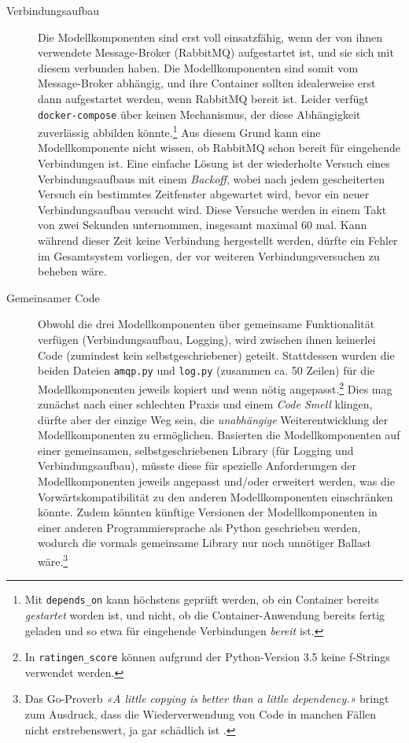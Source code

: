 \begin{description}
    \item[Verbindungsaufbau] Die Modellkomponenten sind erst voll einsatzfähig, wenn der von ihnen verwendete Message-Broker (RabbitMQ) aufgestartet ist, und sie sich mit diesem verbunden haben. Die Modellkomponenten sind somit vom Message-Broker abhängig, und ihre Container sollten idealerweise erst dann aufgestartet werden, wenn RabbitMQ bereit ist. Leider verfügt \texttt{docker-compose} über keinen Mechanismus, der diese Abhängigkeit zuverlässig abbilden könnte.\footnote{Mit \texttt{depends\_on} kann höchstens geprüft werden, ob ein Container bereits \textit{gestartet} worden ist, und nicht, ob die Container-Anwendung bereits fertig geladen und so etwa für eingehende Verbindungen \textit{bereit} ist.} Aus diesem Grund kann eine Modellkomponente nicht wissen, ob RabbitMQ schon bereit für eingehende Verbindungen ist. Eine einfache Lösung ist der wiederholte Versuch eines Verbindungsaufbaus mit einem \textit{Backoff}, wobei nach jedem gescheiterten Versuch ein bestimmtes Zeitfenster abgewartet wird, bevor ein neuer Verbindungsaufbau versucht wird. Diese Versuche werden in einem Takt von zwei Sekunden unternommen, insgesamt maximal 60 mal. Kann während dieser Zeit keine Verbindung hergestellt werden, dürfte ein Fehler im Gesamtsystem vorliegen, der vor weiteren Verbindungsversuchen zu beheben wäre.
    \item[Gemeinsamer Code] Obwohl die drei Modellkomponenten über gemeinsame Funktionalität verfügen (Verbindungsaufbau, Logging), wird zwischen ihnen keinerlei Code (zumindest kein selbstgeschriebener) geteilt. Stattdessen wurden die beiden Dateien \texttt{amqp.py} und \texttt{log.py} (zusammen ca. 50 Zeilen) für die Modellkomponenten jeweils kopiert und wenn nötig angepasst.\footnote{In \texttt{ratingen\_score} können aufgrund der Python-Version 3.5 keine f-Strings verwendet werden.} Dies mag zunächst nach einer schlechten Praxis und einem \textit{Code Smell} klingen, dürfte aber der einzige Weg sein, die \textit{unabhängige} Weiterentwicklung der Modellkomponenten zu ermöglichen. Basierten die Modellkomponenten auf einer gemeinsamen, selbstgeschriebenen Library (für Logging und Verbindungsaufbau), müsste diese für spezielle Anforderungen der Modellkomponenten jeweils angepasst und/oder erweitert werden, was die Vorwärtskompatibilität zu den anderen Modellkomponenten einschränken könnte. Zudem könnten künftige Versionen der Modellkomponenten in einer anderen Programmiersprache als Python geschrieben werden, wodurch die vormals gemeinsame Library nur noch unnötiger Ballast wäre.\footnote{Das Go-Proverb \textit{«A little copying is better than a little dependency.»} bringt zum Ausdruck, dass die Wiederverwendung von Code in manchen Fällen nicht erstrebenswert, ja gar schädlich ist \cite[9:28]{go-proverbs}.}

\end{description}
